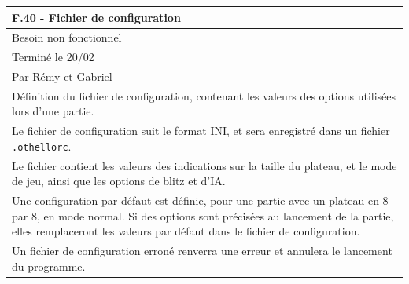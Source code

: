 \documentclass[a4paper,12pt]{article}
\begin{document}
\noindent
\setlength{\arrayrulewidth}{1.5pt}
\renewcommand{\arraystretch}{1.5}
\begin{tabularx}{\textwidth}{|X|}
    \hline
    \textbf{F.40 - Fichier de configuration}                                                                                                                                                                                                   \\
    \hline
    Besoin non fonctionnel                                                                                                                                                                                                                     \\
    \hline
    Terminé le 20/02                                                                                                                                                                                                                           \\
    Par Rémy et Gabriel                                                                                                                                                                                                                        \\
    \hline
    Définition du fichier de configuration, contenant les valeurs des options utilisées lors d’une partie.                                                                                                                                     \\
    Le fichier de configuration suit le format INI, et sera enregistré dans un fichier \texttt{.othellorc}.                                                                                                                                    \\
    Le fichier contient les valeurs des indications sur la taille du plateau, et le mode de jeu, ainsi que les options de blitz et d’IA.                                                                                                       \\
    Une configuration par défaut est définie, pour une partie avec un plateau en 8 par 8, en mode normal. Si des options sont précisées au lancement de la partie, elles remplaceront les valeurs par défaut dans le fichier de configuration. \\
    Un fichier de configuration erroné renverra une erreur et annulera le lancement du programme.                                                                                                                                              \\


\end{tabularx}
\end{document}
